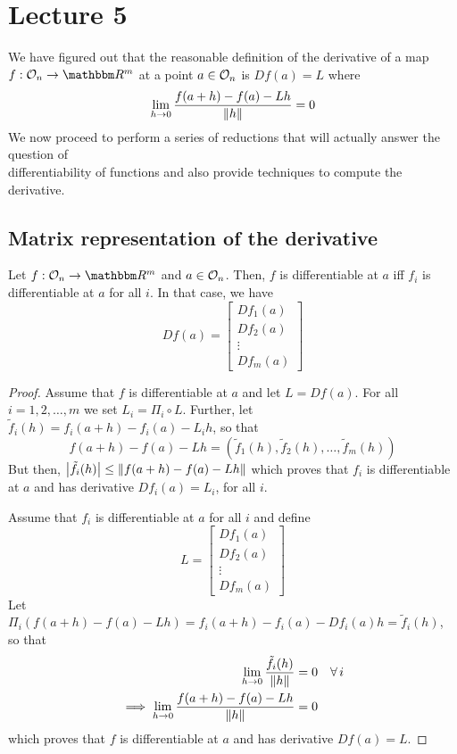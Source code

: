 \documentclass[../Analysis-3]{subfiles}
\begin{document}
\chapter*{Lecture 5} %
\setcounter{chapter}{5} %
\setcounter{section}{0}

We have figured out that the reasonable definition of the derivative of a map $ f: {\cal O}_n \to \R^m $ at a point $ a \in {\cal O}_n $ is $ Df(a) = L $ where
\[ \lim_{h \to 0}  \frac{f(a+h)-f(a)-Lh}{\norm{h}} = 0 \]
We now proceed to perform a series of reductions that will actually answer the question of \\ 
differentiability of functions and also provide techniques to compute the derivative.

\section{Matrix representation of the derivative}

\begin{Thm}{}{}
  Let $ f: {\cal O}_n \to \R^m $ and $ a \in {\cal O}_n $. Then, $ f $ is differentiable at $ a $ iff $ f_i $ is differentiable at $ a $ for all $ i $. In that case, we have
  \[ Df(a) =
    \begin{bmatrix}
      Df_1(a) \\
      Df_2(a) \\
      \vdots  \\
      Df_m(a)
    \end{bmatrix} \]
\end{Thm}

\begin{proof}
  Assume that $ f $ is differentiable at $ a $ and let $ L = Df(a) $. For all $ i = 1,2,\dots,m $ we set $ L_i = \Pi_i \circ L $. Further, let $ \tilde{f}_i(h) = f_i(a+h)-f_i(a)-L_ih $, so that
  \[ f(a+h)-f(a)-Lh = (\tilde{f}_1(h), \tilde{f}_2(h), \dots, \tilde{f}_m(h)) \]
  But then, $ \abs{\tilde{f}_i(h)} \leq \norm{f(a+h)-f(a)-Lh} $ which proves that $ f_i $ is differentiable at $ a $ and has derivative $ Df_i(a) = L_i $, for all $ i $.
  \msk
  
  Assume that $ f_i $ is differentiable at $ a $ for all $ i $ and define
  \[ L =
    \begin{bmatrix}
      Df_1(a) \\
      Df_2(a) \\
      \vdots  \\
      Df_m(a)
    \end{bmatrix} \]
  Let $ \Pi_i(f(a+h)-f(a)-Lh) = f_i(a+h)-f_i(a)-Df_i(a)h =  \tilde{f}_i(h) $, so that
  \begin{align*}
    \lim_{h \to 0} \frac{\tilde{f}_i(h)}{\norm{h}}          & = 0 \quad \forall \, i \\
    \implies \lim_{h \to 0} \frac{f(a+h)-f(a)-Lh}{\norm{h}} & = 0
  \end{align*}
  which proves that $ f $ is differentiable at $ a $ and has derivative $ Df(a) = L $.
\end{proof}
\end{document}
